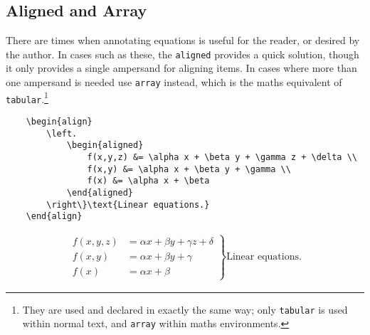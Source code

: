 \subsection{Aligned and Array}
%
There are times when annotating equations is useful for the reader, or desired by the author. In cases such as these, the \verb|aligned| provides a quick solution, though it only provides a single ampersand for aligning items. In cases where more than one ampersand is needed use \verb|array| instead, which is the maths equivalent of \verb|tabular|.\footnote{They are used and declared in exactly the same way; only \texttt{tabular} is used within normal text, and \texttt{array} within maths environments.}
\begin{verbatim}
	\begin{align}
	    \left.
	        \begin{aligned}
	            f(x,y,z) &= \alpha x + \beta y + \gamma z + \delta \\
	            f(x,y) &= \alpha x + \beta y + \gamma \\
	            f(x) &= \alpha x + \beta
	        \end{aligned}
	    \right\}\text{Linear equations.}
	\end{align}
\end{verbatim}
\begin{align}
    \left.
    \begin{aligned}
        f(x,y,z) &= \alpha x + \beta y + \gamma z + \delta \\
        f(x,y) &= \alpha x + \beta y + \gamma\\
        f(x) &= \alpha x + \beta
    \end{aligned}
    \right\}\text{Linear equations.}
\end{align}
%
